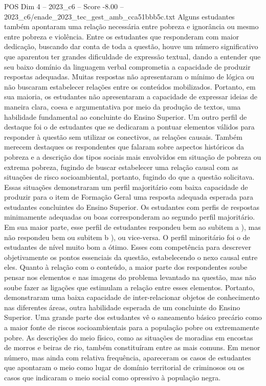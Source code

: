 \begin{textsample}{POS Dim 4 – 2023\_c6 – Score -8.00 – 2023\_c6/enade\_2023\_tec\_gest\_amb\_cca51bbb5c.txt}
Alguns estudantes também apontaram uma relação necessária entre pobreza e ignorância ou mesmo entre pobreza e violência.
Entre os estudantes que responderam com maior dedicação, buscando dar conta de toda a questão, houve um número significativo que aparentou ter grandes dificuldade de expressão textual, dando a entender que seu baixo domínio da linguagem verbal comprometia a capacidade de produzir respostas adequadas.
Muitas respostas não apresentaram o mínimo de lógica ou não buscaram estabelecer relações entre os conteúdos mobilizados.
Portanto, em sua maioria, os estudantes não apresentaram a capacidade de expressar ideias de maneira clara, coesa e argumentativa por meio da produção de textos, uma habilidade fundamental ao concluinte do Ensino Superior.
Um outro perfil de destaque foi o de estudantes que se dedicaram a pontuar elementos válidos para responder à questão sem utilizar os conectivos, as relações causais.
Também merecem destaques os respondentes que falaram sobre aspectos históricos da pobreza e a descrição dos tipos sociais mais envolvidos em situação de pobreza ou extrema pobreza, fugindo de buscar estabelecer uma relação causal com as situações de risco socioambiental, portanto, fugindo do que a questão solicitava.
Essas situações demonstraram um perfil majoritário com baixa capacidade de produzir para o item de Formação Geral uma resposta adequada esperada para estudantes concluintes do Ensino Superior.
Os estudantes com perfis de respostas minimamente adequadas ou boas corresponderam ao segundo perfil majoritário.
Em sua maior parte, esse perfil de estudantes respondeu bem ao subitem a ), mas não respondeu bem ou subitem b ), ou vice-versa.
O perfil minoritário foi o de estudantes de nível muito bom a ótimo.
Esses com competência para descrever objetivamente os pontos essenciais da questão, estabelecendo o nexo causal entre eles.
Quanto à relação com o conteúdo, a maior parte dos respondentes soube pensar nos elementos e nas imagens do problema levantado na questão, mas não soube fazer as ligações que estimulam a relação entre esses elementos.
Portanto, demonstraram uma baixa capacidade de inter-relacionar objetos de conhecimento nas diferentes áreas, outra habilidade esperada de um concluinte do Ensino Superior.
Uma grande parte dos estudantes vê o saneamento básico precário como a maior fonte de riscos socioambientais para a população pobre ou extremamente pobre.
As descrições do meio físico, como as situações de moradias em encostas de morros e beiras de rio, também constituíram entre as mais comuns.
Em menor número, mas ainda com relativa frequência, apareceram os casos de estudantes que apontaram o meio como lugar de domínio territorial de criminosos ou os casos que indicaram o meio social como opressivo à população negra.

\end{textsample}
